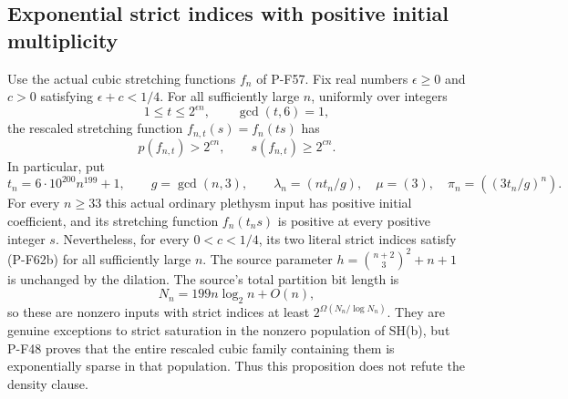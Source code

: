 \subsection{Exponential strict indices with positive initial multiplicity}

\begin{proposition}
\label{prop:positivestartdilation}
Use the actual cubic stretching functions $f_n$ of P-F57.
Fix real numbers $\epsilon\ge0$ and $c>0$ satisfying
$\epsilon+c<1/4$. For all sufficiently large $n$, uniformly
over integers
\[
           1\le t\le2^{\epsilon n},\qquad \gcd(t,6)=1,
                                                               \tag{P-F62a}
\]
the rescaled stretching function $f_{n,t}(s)=f_n(ts)$ has
\[
          p(f_{n,t})>2^{cn},\qquad s(f_{n,t})\ge2^{cn}.
                                                               \tag{P-F62b}
\]
In particular, put
\[
 t_n=6\cdot10^{200}n^{199}+1,\qquad
 g=\gcd(n,3),\qquad
 \lambda_n=(nt_n/g),\quad \mu=(3),\quad
 \pi_n=((3t_n/g)^n).
                                                               \tag{P-F62c}
\]
For every $n\ge33$ this actual ordinary plethysm input has
positive initial coefficient, and its stretching function
$f_n(t_ns)$ is positive at every positive integer $s$.
Nevertheless, for every $0<c<1/4$, its two literal strict
indices satisfy (P-F62b) for all sufficiently large $n$.
The source parameter $h=\binom{n+2}{3}^2+n+1$ is unchanged
by the dilation. The source's total partition bit length is
\[
                  N_n=199n\log_2n+O(n),
                                                               \tag{P-F62d}
\]
so these are nonzero inputs with strict indices at least
$2^{\Omega(N_n/\log N_n)}$.
They are genuine exceptions to strict saturation in the
nonzero population of SH(b), but P-F48 proves that the entire
rescaled cubic family containing them is exponentially
sparse in that population. Thus this proposition does not
refute the density clause.
\end{proposition}

